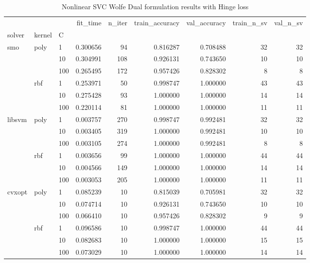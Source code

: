 \begin{table}[H]
\centering
\caption{Nonlinear SVC Wolfe Dual formulation results with Hinge loss}
\label{nonlinear_dual_svc_cv_results}
\begin{tabular}{lllrrrrrr}
\toprule
       &     &     &  fit\_time &  n\_iter &  train\_accuracy &  val\_accuracy &  train\_n\_sv &  val\_n\_sv \\
solver & kernel & C &           &         &                 &               &             &           \\
\midrule
smo & poly & 1   &  0.300656 &      94 &        0.816287 &      0.708488 &          32 &        32 \\
       &     & 10  &  0.304991 &     108 &        0.926131 &      0.743650 &          10 &        10 \\
       &     & 100 &  0.265495 &     172 &        0.957426 &      0.828302 &           8 &         8 \\
       & rbf & 1   &  0.253971 &      50 &        0.998747 &      1.000000 &          43 &        43 \\
       &     & 10  &  0.275428 &      93 &        1.000000 &      1.000000 &          14 &        14 \\
       &     & 100 &  0.220114 &      81 &        1.000000 &      1.000000 &          11 &        11 \\
libsvm & poly & 1   &  0.003757 &     270 &        0.998747 &      0.992481 &          32 &        32 \\
       &     & 10  &  0.003405 &     319 &        1.000000 &      0.992481 &          10 &        10 \\
       &     & 100 &  0.003105 &     274 &        1.000000 &      0.992481 &           8 &         8 \\
       & rbf & 1   &  0.003656 &      99 &        1.000000 &      1.000000 &          44 &        44 \\
       &     & 10  &  0.004566 &     149 &        1.000000 &      1.000000 &          14 &        14 \\
       &     & 100 &  0.003053 &     205 &        1.000000 &      1.000000 &          11 &        11 \\
cvxopt & poly & 1   &  0.085239 &      10 &        0.815039 &      0.705981 &          32 &        32 \\
       &     & 10  &  0.074714 &      10 &        0.926131 &      0.743650 &          10 &        10 \\
       &     & 100 &  0.066410 &      10 &        0.957426 &      0.828302 &           9 &         9 \\
       & rbf & 1   &  0.096586 &      10 &        0.998747 &      1.000000 &          44 &        44 \\
       &     & 10  &  0.082683 &      10 &        1.000000 &      1.000000 &          15 &        15 \\
       &     & 100 &  0.073029 &      10 &        1.000000 &      1.000000 &          14 &        14 \\
\bottomrule
\end{tabular}
\end{table}
